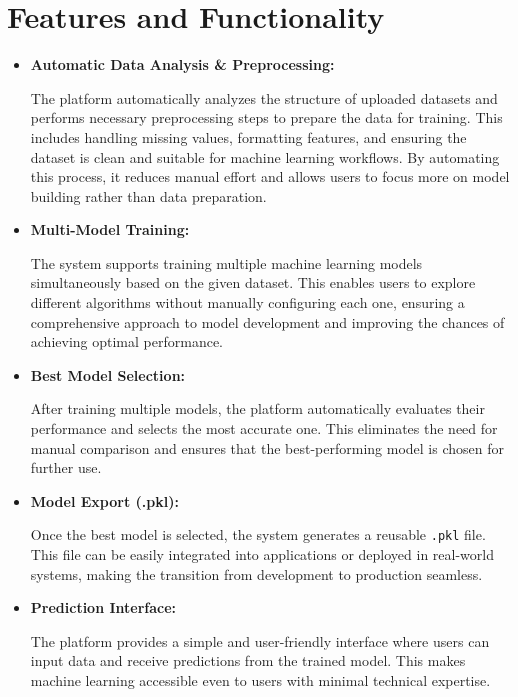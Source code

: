 \section{Features and Functionality}
\begin{itemize}
\item \textbf{Automatic Data Analysis \& Preprocessing:}

The platform automatically analyzes the structure of uploaded datasets and performs necessary preprocessing steps to prepare the data for training. This includes handling missing values, formatting features, and ensuring the dataset is clean and suitable for machine learning workflows. By automating this process, it reduces manual effort and allows users to focus more on model building rather than data preparation.\\

\item \textbf{Multi-Model Training:}

The system supports training multiple machine learning models simultaneously based on the given dataset. This enables users to explore different algorithms without manually configuring each one, ensuring a comprehensive approach to model development and improving the chances of achieving optimal performance.\\

\item \textbf{Best Model Selection:}

After training multiple models, the platform automatically evaluates their performance and selects the most accurate one. This eliminates the need for manual comparison and ensures that the best-performing model is chosen for further use.\\

\item \textbf{Model Export (.pkl):}

Once the best model is selected, the system generates a reusable \texttt{.pkl} file. This file can be easily integrated into applications or deployed in real-world systems, making the transition from development to production seamless.\\

\item \textbf{Prediction Interface:}

The platform provides a simple and user-friendly interface where users can input data and receive predictions from the trained model. This makes machine learning accessible even to users with minimal technical expertise.\\


\end{itemize}
